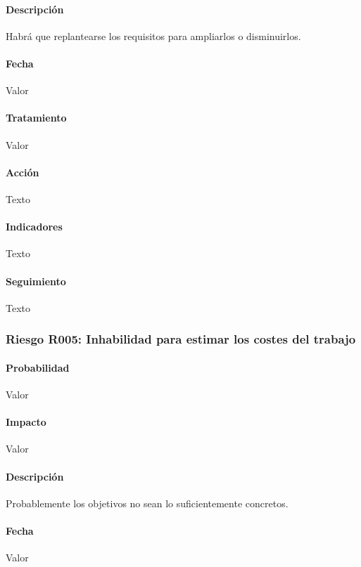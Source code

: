 \documentclass[10pt,a4paper]{article}
\begin{document}
				\paragraph{Descripción} Habrá que replantearse los requisitos para ampliarlos o disminuirlos. 
				\paragraph{Fecha} Valor %
				\paragraph{Tratamiento} Valor %
				\paragraph{Acción} Texto %
				\paragraph{Indicadores} Texto %
				\paragraph{Seguimiento}	Texto %
				
				\subsubsection{Riesgo R005: Inhabilidad para estimar los costes del trabajo}
				\paragraph{Probabilidad} Valor
				\paragraph{Impacto}	Valor
				\paragraph{Descripción} Probablemente los objetivos no sean lo suficientemente concretos.
				\paragraph{Fecha} Valor %
\end{document}
